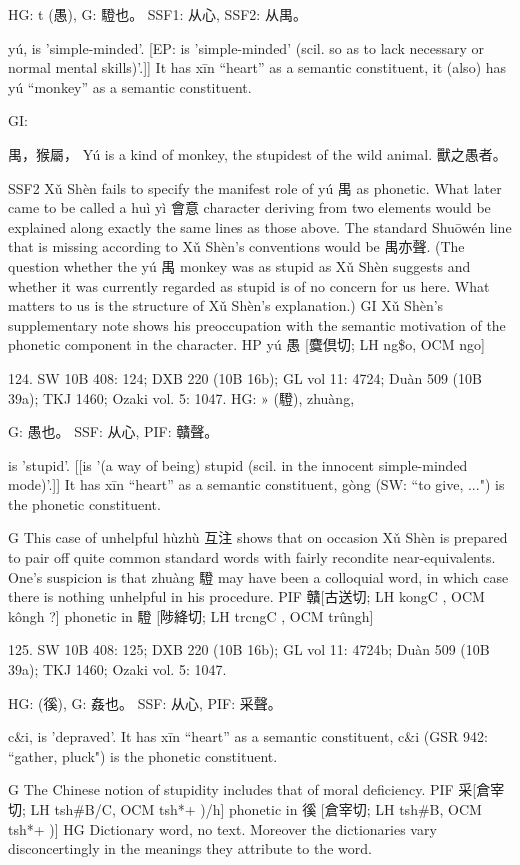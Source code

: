 HG: t (愚),
G:	䮴也。
SSF1: 从心,
SSF2: 从禺。


yú,
is 'simple-minded'. [EP: is 'simple-minded' (scil. so as to lack necessary or normal mental skills)'.]]
It has xīn ``heart'' as a semantic constituent,
it (also) has yú ``monkey'' as a semantic constituent.

GI:

禺，猴屬， Yú is a kind of monkey, the stupidest of the wild animal.
獸之愚者。

SSF2 Xǔ Shèn fails to specify the manifest role of yú 禺 as phonetic. What later came to be called a huì yì 會意 character deriving from two elements would be explained along exactly the same lines as those above. The standard Shuōwén line that is missing according to Xǔ Shèn's conventions would be 禺亦聲. (The question whether the yú 禺 monkey was as stupid as Xǔ Shèn suggests and whether it was currently regarded as stupid is of no concern for us here. What matters to us is the structure of Xǔ Shèn's explanation.)
GI Xǔ Shèn's supplementary note shows his preoccupation with the semantic motivation of the phonetic component in the character.
HP   yú 愚 [麌倶切; LH ng\$o, OCM ngo]

124. SW 10B 408: 124; DXB 220 (10B 16b); GL vol 11: 4724; Duàn 509 (10B 39a); TKJ 1460; Ozaki vol. 5: 1047.
HG: » (䮴), zhuàng,

G:	愚也。
SSF: 从心,
PIF: 贛聲。

is 'stupid'. [[is '(a way of being) stupid (scil. in the innocent simple-minded mode)'.]]
It has xīn ``heart'' as a semantic constituent,
gòng (SW: ``to give, ...") is the phonetic constituent.

G This case of unhelpful hùzhù 互注 shows that on occasion Xǔ Shèn is prepared to pair off quite common standard words with fairly recondite near-equivalents. One's suspicion is that zhuàng 䮴 may have been a colloquial word, in which case there is nothing unhelpful in his procedure.
PIF  贛[古送切; LH kongC , OCM kôngh ?] phonetic in 䮴 [陟絳切; LH trcngC , OCM trûngh]



125. SW 10B 408: 125; DXB 220 (10B 16b); GL vol 11: 4724b; Duàn 509 (10B 39a); TKJ 1460; Ozaki vol. 5: 1047.


HG:	(徯),
G:	姦也。
SSF: 从心,
PIF: 采聲。

c&i,
is 'depraved'.
It has xīn ``heart'' as a semantic constituent,
c&i (GSR 942: ``gather, pluck") is the phonetic constituent.

G	The Chinese notion of stupidity includes that of moral deficiency.
PIF     采[倉宰切; LH tsh\#B/C, OCM tsh*+ )/h] phonetic in 徯 [倉宰切; LH tsh\#B, OCM tsh*+ )]
HG Dictionary word, no text. Moreover the dictionaries vary disconcertingly in the meanings they attribute to the word.

